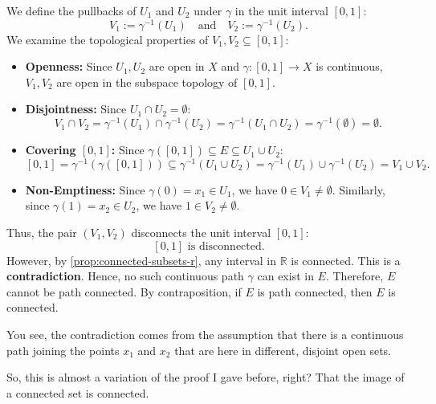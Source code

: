 \begin{proofWrapper}
\begin{content}
We define the pullbacks of $U_1$ and $U_2$ under $\gamma$ in the unit interval $[0, 1]$:
\begin{equation}\label{eq:v-pullbacks-interval}
V_1 := \gamma^{-1}(U_1) \quad \text{and} \quad V_2 := \gamma^{-1}(U_2).
\end{equation}
We examine the topological properties of $V_1, V_2 \subseteq [0, 1]$:
\begin{itemize}
    \item \textbf{Openness:} Since $U_1, U_2$ are open in $X$ and $\gamma \colon [0, 1] \to X$ is continuous, $V_1, V_2$ are open in the subspace topology of $[0, 1]$.
    \item \textbf{Disjointness:} Since $U_1 \cap U_2 = \emptyset$:
    \[
    V_1 \cap V_2 = \gamma^{-1}(U_1) \cap \gamma^{-1}(U_2) = \gamma^{-1}(U_1 \cap U_2) = \gamma^{-1}(\emptyset) = \emptyset.
    \]
    \item \textbf{Covering $[0, 1]$:} Since $\gamma([0, 1]) \subseteq E \subseteq U_1 \cup U_2$:
    \[
    [0, 1] = \gamma^{-1}(\gamma([0, 1])) \subseteq \gamma^{-1}(U_1 \cup U_2) = \gamma^{-1}(U_1) \cup \gamma^{-1}(U_2) = V_1 \cup V_2.
    \]
    \item \textbf{Non-Emptiness:} Since $\gamma(0) = x_1 \in U_1$, we have $0 \in V_1 \neq \emptyset$. Similarly, since $\gamma(1) = x_2 \in U_2$, we have $1 \in V_2 \neq \emptyset$.
\end{itemize}
Thus, the pair $(V_1, V_2)$ disconnects the unit interval $[0, 1]$:
\[
[0, 1] \text{ is disconnected.}
\]
However, by \cref{prop:connected-subsets-r}, any interval in $\mathbb{R}$ is connected. This is a \textbf{contradiction}.
Hence, no such continuous path $\gamma$ can exist in $E$.
Therefore, $E$ cannot be path connected.
By contraposition, if $E$ is path connected, then $E$ is connected.
\end{content}

\begin{speech}[00:43:15 - 00:43:48]
You see, the contradiction comes from the assumption that there is a continuous path joining the points $x_1$ and $x_2$ that are here in different, disjoint open sets.

So, this is almost a variation of the proof I gave before, right? That the image of a connected set is connected. 
\end{speech}

\end{proofWrapper}

